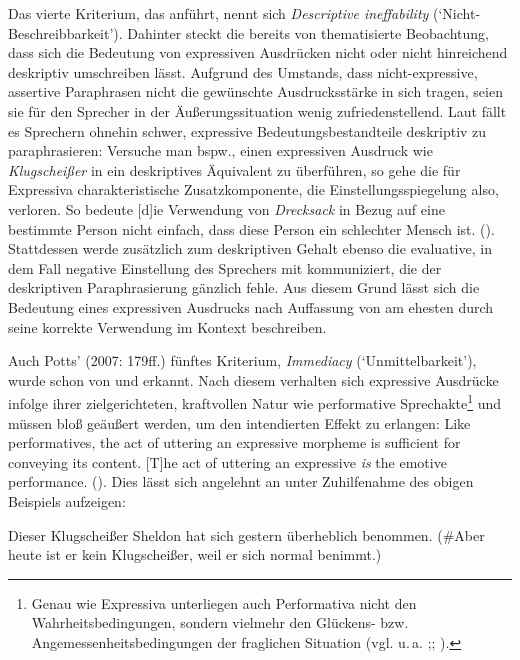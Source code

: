 Das vierte Kriterium, das \citet[176ff.]{Potts.2007a} anführt, nennt sich \textit{Descriptive ineffability} (`Nicht-Beschreibbarkeit'). Dahinter steckt die bereits von {\citet[156]{Hayner.1956}} thematisierte Beobachtung, dass sich die Bedeutung von expressiven Ausdrücken nicht oder nicht hinreichend deskriptiv umschreiben lässt. Aufgrund des Umstands, dass nicht-expressive, assertive Paraphrasen nicht die gewünschte Ausdrucksstärke in sich tragen, seien sie für den Sprecher in der Äußerungssituation wenig zufriedenstellend. Laut \citet[12]{dAvis.2019b} fällt es Sprechern ohnehin schwer, expressive Bedeutungsbestandteile deskriptiv zu paraphrasieren: Versuche man bspw., einen expressiven Ausdruck wie \textit{Klugscheißer} in ein deskriptives Äquivalent zu überführen, so gehe die für Expressiva charakteristische Zusatzkomponente, die Einstellungsspiegelung also, verloren. So bedeute \glqq{}[d]ie Verwendung von \textit{Drecksack} in Bezug auf eine bestimmte Person \textelp{} nicht einfach, dass diese Person ein schlechter Mensch ist.\grqq{} ({\citealt[12]{dAvis.2019b}}). Stattdessen werde zusätzlich zum deskriptiven Gehalt ebenso die evaluative, in dem Fall negative Einstellung des Sprechers mit kommuniziert, die der deskriptiven Paraphrasierung gänzlich fehle. Aus diesem Grund lässt sich die Bedeutung eines expressiven Ausdrucks nach Auffassung von {\citet[10]{Kaplan.1997}} am ehesten durch seine korrekte Verwendung im Kontext beschreiben.

Auch Potts' (2007: 179ff.) fünftes Kriterium, \textit{Immediacy} (`{Unmittelbarkeit}'), wurde schon von \citet[151]{Hayner.1956} und \citet[285]{Cruse.1986} erkannt. Nach diesem verhalten sich expressive Ausdrücke infolge ihrer zielgerichteten, kraftvollen Natur wie performative Sprechakte\footnote{Genau wie Expressiva unterliegen auch Performativa nicht den Wahrheitsbedingungen, sondern vielmehr den Glückens- bzw. Angemessenheitsbedingungen
der fraglichen Situation (vgl. u.\,a. \citealt[75f.]{Austin.1972};; \citealt[176f.]{Chierchia.1990}).} und müssen bloß geäußert werden, um den intendierten Effekt zu erlangen: \glqq{}Like {performatives}, the act of uttering an expressive morpheme is sufficient for conveying its content. \textelp{} [T]he act of uttering an expressive \textit{is} the emotive performance.\grqq{} ({\citealt[180]{Potts.2007a}}). Dies lässt sich angelehnt an {\citet[12]{dAvis.2019b}} unter Zuhilfenahme des obigen {Beispiels  aufzeigen}:

\ea  Dieser Klugscheißer Sheldon hat sich gestern überheblich benommen. (\#Aber heute ist er kein Klugscheißer, weil er sich normal benimmt.)
\z

